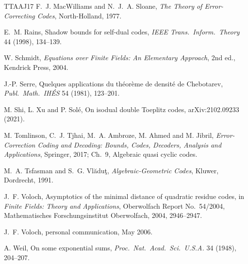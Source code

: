 \documentclass[12pt,letterpaper]{article}
\theoremstyle{definition}
\theoremstyle{remark}
\numberwithin{equation}{section}
\begin{document}
\begin{thebibliography}{TTAAJ17}
 F.~J. MacWilliams and N.~J.~A. Sloane, \emph{The Theory of
Error-Correcting Codes}, North-Holland, 1977.

 E.~M. Rains, Shadow bounds for self-dual codes, \emph{IEEE Trans.\
Inform.\ Theory} 44 (1998), 134--139.

 W. Schmidt, \emph{Equations over Finite Fields: An Elementary
Approach}, 2nd ed., Kendrick Press, 2004.

 J.-P. Serre, Quelques applications du th\'eor\`eme de densit\'e de
Chebotarev, \emph{Publ.\ Math.\ IH\'ES} 54 (1981), 123--201.

 M. Shi, L. Xu and P. Sol\'e, On isodual double Toeplitz codes,
arXiv:2102.09233 (2021).

 M. Tomlinson, C.~J. Tjhai, M.~A. Ambroze, M. Ahmed and M. Jibril,
\emph{Error-Correction Coding and Decoding: Bounds, Codes, Decoders, Analysis and
Applications}, Springer, 2017; Ch.~9, Algebraic quasi cyclic codes.

 M.~A. Tsfasman and S.~G. Vl\u{a}du\c{t}, \emph{Algebraic-Geometric
Codes}, Kluwer, Dordrecht, 1991.

 J.~F. Voloch, Asymptotics of the minimal distance of quadratic residue
codes, in \emph{Finite Fields: Theory and Applications}, Oberwolfach Report
No.~54/2004, Mathematisches Forschungsinstitut Oberwolfach, 2004, 2946--2947.

 J.~F. Voloch, personal communication, May 2006.

 A. Weil, On some exponential sums, \emph{Proc.\ Nat.\ Acad.\ Sci.\
U.S.A.} 34 (1948), 204--207.

\end{thebibliography}
\end{document}
